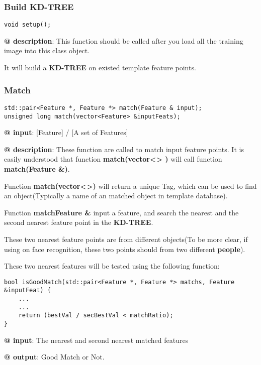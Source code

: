 \documentclass[paper=a4, fontsize=11pt]{scrartcl} %
\numberwithin{equation}{section} %
\numberwithin{figure}{section} %
\numberwithin{table}{section} %
\begin{document}
\subsubsection{Build KD-TREE}
\begin{lstlisting}
void setup();
\end{lstlisting}

\textbf{@ description}: This function should be called after you load all the training image into this class object.

It will build a \textbf{KD-TREE} on existed template feature points.

\subsubsection{Match}

\begin{lstlisting}
std::pair<Feature *, Feature *> match(Feature & input);
unsigned long match(vector<Feature> &inputFeats);
\end{lstlisting}

\textbf{@ input}: [Feature] / [A set of Features]

\textbf{@ description}: These function are called to match input feature points. It is easily understood that function \textbf{match(vector<> )} will call function \textbf{match(Feature \&)}.

Function \textbf{match(vector<>)} will return a unique Tag, which can be used to find an object(Typically a name of an matched object in template database). 

Function \textbf{match{Feature \&}} input a feature, and search the nearest and the second nearest feature point in the \textbf{KD-TREE}. 

These two nearest feature points are from different objects(To be more clear, if using on face recognition, these two points should from two different \textbf{people}).

These two nearest features will be tested using the following function:\\

\begin{lstlisting}
bool isGoodMatch(std::pair<Feature *, Feature *> matchs, Feature &inputFeat) {
    ...
    ...
    return (bestVal / secBestVal < matchRatio);
}
\end{lstlisting}

\textbf{@ input}: The nearest and second nearest matched features

\textbf{@ output}: Good Match or Not.
\end{document}
